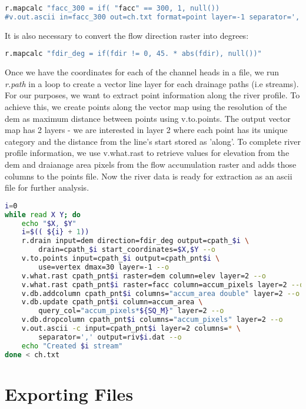 \begin{lstlisting}[language=bash]
r.mapcalc "facc_300 = if( "facc" == 300, 1, null())
#v.out.ascii in=facc_300 out=ch.txt format=point layer=-1 separator=',' --o
\end{lstlisting}

It is also necessary to convert the flow direction raster into degrees:

\begin{lstlisting}[language=bash]
r.mapcalc "fdir_deg = if(fdir != 0, 45. * abs(fdir), null())"
\end{lstlisting}

Once we have the coordinates for each of the channel heads in a file, we run \textit{r.path} in a loop to create a vector line layer for each drainage paths (i.e streams). For our purposes, we want to extract point information along the river profile. To achieve this, we create points along the vector map using the resolution of the dem as maximum distance between points using v.to.points. The output vector map has 2 layers - we are interested in layer 2 where each point has its unique category and the distance from the line's start stored as 'along'. To complete river profile information, we use v.what.rast to retrieve values for elevation from the dem and draianage area pixels from the flow accumulation raster and adds those columns to the points file. Now the river data is ready for extraction as an ascii file for further analysis. 

\begin{lstlisting}[language=bash]
i=0
while read X Y; do 
	echo "$X, $Y"
	i=$(( ${i} + 1))
	r.drain input=dem direction=fdir_deg output=cpath_$i \
		drain=cpath_$i start_coordinates=$X,$Y --o 
	v.to.points input=cpath_$i output=cpath_pnt$i \
		use=vertex dmax=30 layer=-1 --o
	v.what.rast cpath_pnt$i raster=dem column=elev layer=2 --o
	v.what.rast cpath_pnt$i raster=facc column=accum_pixels layer=2 --o
	v.db.addcolumn cpath_pnt$i columns="accum_area double" layer=2 --o
	v.db.update cpath_pnt$i column=accum_area \
		query_col="accum_pixels*${SQ_M}" layer=2 --o
	v.db.dropcolumn cpath_pnt$i columns="accum_pixels" layer=2 --o
	v.out.ascii -c input=cpath_pnt$i layer=2 columns=* \
		separator=',' output=riv$i.dat --o
	echo "Created $i stream"
done < ch.txt
\end{lstlisting}

\section{Exporting Files}

